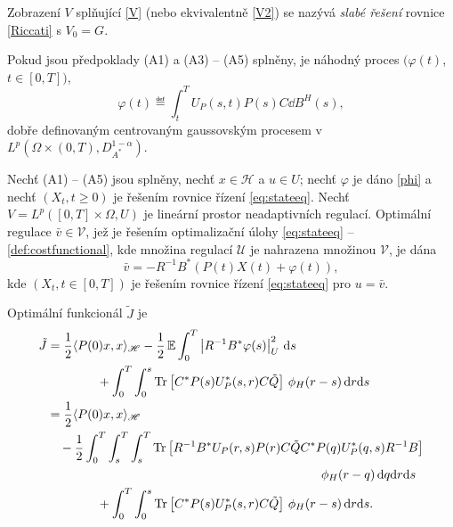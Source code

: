 Zobrazení $V$ splňující \eqref{V} (nebo ekvivalentně \eqref{V2}) se nazývá
{\em slabé řešení} rovnice \eqref{Riccati} s $V_0=G$.

\begin{lemma}
    Pokud jsou předpoklady (A1) a (A3) -- (A5) splněny, je náhodný proces
    $(\varphi(t)$, $t\in[0,T])$, 
    \begin{equation}
        \varphi(t) \eqdef \int_t^T U_P(s,t)P(s)C\dd B^H(s),
        \label{phi}
    \end{equation}
    dobře definovaným centrovaným gaussovským procesem v $L^p\left( \Omega\times
    \left( 0,T \right), D_{A^*}^{1-\alpha} \right)$.
    \label{}
\end{lemma}

\begin{veta}
    Nechť (A1) -- (A5) jsou splněny, nechť $x\in\mathscr{H}$ a $u\in U$; nechť
    $\varphi$ je dáno \eqref{phi} a nechť $(X_t, t\geq 0)$ je řešením rovnice řízení 
    \eqref{eq:stateeq}. Nechť $V = L^p \left( [0,T]\times\Omega, U \right)$ je lineární prostor 
    neadaptivních regulací. Optimální regulace $\bar{v}\in\mathscr{V}$, jež je
    řešením optimalizační úlohy \eqref{eq:stateeq} --
    \eqref{def:costfunctional}, kde množina regulací $\mathscr{U}$ je nahrazena
    množinou $\mathscr{V}$, je dána
    \begin{equation*}
        \bar{v} = -R^{-1} B^* \left( P(t)X(t) + \varphi(t) \right),
        \label{}
    \end{equation*}
    kde $(X_t, t\in[0,T])$ je řešením rovnice řízení \eqref{eq:stateeq} pro
    $u=\bar{v}$.

    Optimální funkcionál $\tilde{J}$ je
    \begin{equation*}\label{}
    \begin{split}
        \tilde{J} &= \frac{1}{2} \langle P(0)x,x\rangle_\mathscr{H} -
        \frac{1}{2}\operatorname{\mathbb{E}}\int_0^T\left| R^{-1}B^*\varphi(s) \right|_U^2\,\mathrm{d} s \\
        &\qquad\qquad  + \int_0^T \int_0^s \operatorname{Tr} \left[ C^*P(s)U_P^*(s,r)C\tilde{Q}
        \right]\,\phi_H(r-s)\,\mathrm{d} r\! \,\mathrm{d} s\\
        &= \frac{1}{2} \langle P(0)x,x\rangle_\mathscr{H}\\
        &\quad - \frac{1}{2}\int_0^T \int_s^T\int_s^T \operatorname{Tr} \left[
        R^{-1} B^* U_P(r,s) P(r) C \tilde{Q} C^* P(q) U_P^*(q,s) R^{-1} B \right]\\
        &\qquad\qquad\qquad\qquad\qquad\qquad\qquad\qquad\qquad\qquad\qquad
        \phi_H(r-q) \,\mathrm{d} q\! \,\mathrm{d} r\! \,\mathrm{d} s\\
        &\qquad\qquad + \int_0^T \int_0^s \operatorname{Tr} \left[ C^*P(s)U_P^*(s,r)C\tilde{Q}
        \right]\,\phi_H(r-s)\,\mathrm{d} r\! \,\mathrm{d} s.
    \end{split}
\end{equation*}
\end{veta}

